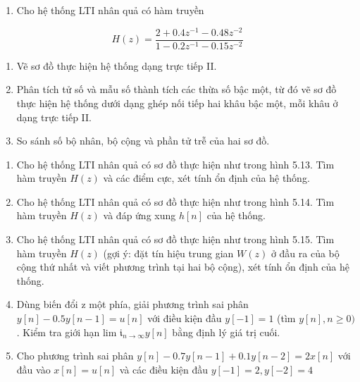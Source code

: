 \documentclass[
  10
]{article}
\providecommand{\tightlist}{%
  \setlength{\itemsep}{0pt}\setlength{\parskip}{0pt}}
\begin{document}
\begin{enumerate}
\def\labelenumi{\arabic{enumi}.}
\setcounter{enumi}{16}
\tightlist
\item
  Cho hệ thống LTI nhân quả có hàm truyền
\end{enumerate}

\[
H (z) = \frac {2 + 0 . 4 z ^ {- 1} - 0 . 4 8 z ^ {- 2}}{1 - 0 . 2 z ^ {- 1} - 0 . 1 5 z ^ {- 2}}
\]

\begin{enumerate}
\def\labelenumi{(\alph{enumi})}
\item
  Vẽ sơ đồ thực hiện hệ thống dạng trực tiếp II.
\item
  Phân tích tử số và mẫu số thành tích các thừa số bậc một, từ đó vẽ sơ
  đồ thực hiện hệ thống dưới dạng ghép nối tiếp hai khâu bậc một, mỗi
  khâu ở dạng trực tiếp II.
\item
  So sánh số bộ nhân, bộ cộng và phần tử trễ của hai sơ đồ.
\end{enumerate}

\begin{enumerate}
\def\labelenumi{\arabic{enumi}.}
\setcounter{enumi}{17}
\item
  Cho hệ thống LTI nhân quả có sơ đồ thực hiện như trong hình 5.13. Tìm
  hàm truyền \(H ( z )\) và các điểm cực, xét tính ổn định của hệ thống.
\item
  Cho hệ thống LTI nhân quả có sơ đồ thực hiện như trong hình 5.14. Tìm
  hàm truyền \(H ( z )\) và đáp ứng xung \(h [ n ]\) của hệ thống.
\item
  Cho hệ thống LTI nhân quả có sơ đồ thực hiện như trong hình 5.15. Tìm
  hàm truyền \(H ( z )\) (gợi ý: đặt tín hiệu trung gian \(W ( z )\) ở
  đầu ra của bộ cộng thứ nhất và viết phương trình tại hai bộ cộng), xét
  tính ổn định của hệ thống.
\item
  Dùng biến đổi z một phía, giải phương trình sai phân
  \(y [ n ] - 0 . 5 y [ n - 1 ] = u [ n ]\) với điều kiện đầu
  \(y [ - 1 ] = 1\) (tìm \(y [ n ] , n \geq 0 )\) . Kiểm tra giới hạn
  lim \(\mathfrak { i } _ { n \to \infty } y [ n ]\) bằng định lý giá
  trị cuối.
\item
  Cho phương trình sai phân
  \(y [ n ] - 0 . 7 y [ n - 1 ] + 0 . 1 y [ n - 2 ] = 2 x [ n ]\) với
  đầu vào \(x [ n ] = u [ n ]\) và các điều kiện đầu
  \(y [ - 1 ] = 2 , y [ - 2 ] = 4\)
\end{enumerate}
\end{document}
